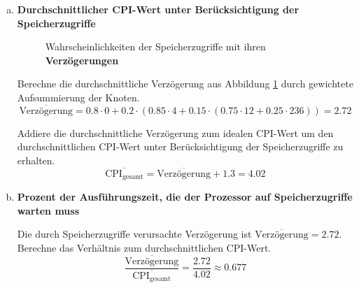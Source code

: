 \begin{enumerate}[a)]
	\item \textbf{Durchschnittlicher CPI-Wert unter Berücksichtigung der Speicherzugriffe}
	\begin{figure}[h!]
		\centering
		\caption{Wahrscheinlichkeiten der Speicherzugriffe mit ihren \textbf{Verzögerungen}}
		\label{fig:prob1}
	\end{figure}

	Berechne die durchschnittliche Verzögerung aus Abbildung \ref{fig:prob1} durch gewichtete Aufsummierung der Knoten.
	\begin{equation}
		\overline{\text{Verzögerung}} = 0.8 \cdot 0 + 0.2 \cdot (0.85 \cdot 4 + 0.15 \cdot(0.75 \cdot 12 + 0.25 \cdot 236)) = 2.72
		\label{eq:avgdelay1}
	\end{equation}
	
	
	Addiere die durchschnittliche Verzögerung zum idealen CPI-Wert um den durchschnittlichen CPI-Wert unter Berücksichtigung der Speicherzugriffe zu erhalten.
	\begin{equation}
		\overline{\text{CPI}_\text{gesamt}} = \overline{\text{Verzögerung}} + 1.3 = 4.02
	\end{equation}
	
	
	\item \textbf{Prozent der Ausführungszeit, die der Prozessor auf Speicherzugriffe warten muss}
	
	Die durch Speicherzugriffe verursachte Verzögerung ist $ \overline{\text{Verzögerung}} = 2.72 $. Berechne das Verhältnis zum durchschnittlichen CPI-Wert.
	\begin{equation}
		\frac{\overline{\text{Verzögerung}}}{\overline{\text{CPI}_\text{gesamt}}} = \frac{2.72}{4.02} \approx 0.677
	\end{equation}
	

\end{enumerate}
